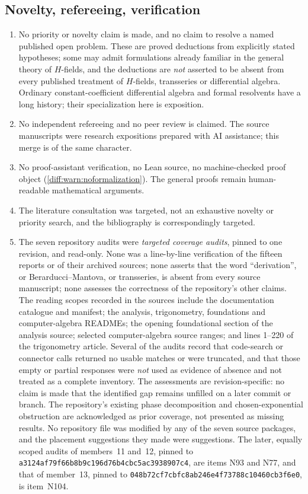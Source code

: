 \documentclass[11pt,letterpaper]{article}
\numberwithin{equation}{section}
\theoremstyle{definition}
\theoremstyle{remark}
\newcommand{\CommitC}{\nolinkurl{a3124af79f66b8b9c196d76b4cbc5ac3938907c4}}
\newcommand{\CommitD}{\nolinkurl{048b72cf7cbfc8ab246e4f73788c10460cb3f6e0}}
\begin{document}
\subsection{Novelty, refereeing, verification}
\label{diff:sub:nc:novelty}

\begin{enumerate}[label=\textup{N\arabic*.},leftmargin=3.0em,itemsep=0.35em,start=9]
\item No priority or novelty claim is made, and no claim to resolve a named
published open problem. These are proved deductions from explicitly stated
hypotheses; some may admit formulations already familiar in the general theory
of $H$-fields, and the deductions are \emph{not} asserted to be absent from
every published treatment of $H$-fields, transseries or differential algebra.
Ordinary constant-coefficient differential algebra and formal resolvents have
a long history; their specialization here is exposition.
\item No independent refereeing and no peer review is claimed. The source
manuscripts were research expositions prepared with AI assistance; this merge
is of the same character.
\item No proof-assistant verification, no Lean source, no machine-checked
proof object (\cref{diff:warn:noformalization}). The general proofs remain
human-readable mathematical arguments.
\item The literature consultation was targeted, not an exhaustive novelty or
priority search, and the bibliography is correspondingly targeted.
\item The seven repository audits were \emph{targeted coverage audits}, pinned
to one revision, and read-only. None was a line-by-line verification of the
fifteen reports or of their archived sources; none asserts that the word
``derivation'', or Berarducci--Mantova, or transseries, is absent from every
source manuscript; none assesses the correctness of the repository's other
claims. The reading scopes recorded in the sources include the documentation
catalogue and manifest; the analysis, trigonometry, foundations and
computer-algebra READMEs; the opening foundational section of the analysis
source; selected computer-algebra source ranges; and lines 1--220 of the
trigonometry article. Several of the audits record that code-search or
connector calls returned no usable matches or were truncated, and that those
empty or partial responses were \emph{not} used as evidence of absence and not
treated as a complete inventory. The assessments are revision-specific: no
claim is made that the identified gap remains unfilled on a later commit or
branch. The repository's existing phase decomposition and chosen-exponential
obstruction are acknowledged as prior coverage, not presented as missing
results. No repository file was modified by any of the seven source packages,
and the placement suggestions they made were suggestions. The later, equally
scoped audits of members~11 and~12, pinned to \CommitC, are items N93 and N77,
and that of member~13, pinned to \CommitD, is item~N104.
\end{enumerate}
\end{document}
